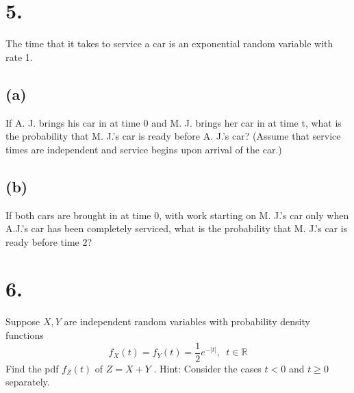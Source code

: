 \documentclass{article}
\begin{document}
\section*{5.}
{\Large 
The time that it takes to service a car is an exponential random variable with rate 1.

\subsection*{(a)}
If A. J. brings his car in at time 0 and M. J. brings her car in at time t, what is the
probability that M. J.’s car is ready before A. J.’s car? (Assume that service times are
independent and service begins upon arrival of the car.)


\subsection*{(b)}
If both cars are brought in at time 0, with work starting on M. J.’s car only when A.J.’s
car has been completely serviced, what is the probability that M. J.’s car is ready before
time 2?


}

\section*{6.}
{\Large 
Suppose  $X, Y$  are independent random variables with probability density functions
\[f_X (t) = f_Y (t) =\frac12e^{-|t|}, \,\,\, t \in \mathbb R\]
Find the pdf $f_Z (t)$ of $Z = X + Y$ . Hint: Consider the cases $t < 0$ and $t \ge 0$ separately.


}
\end{document}
